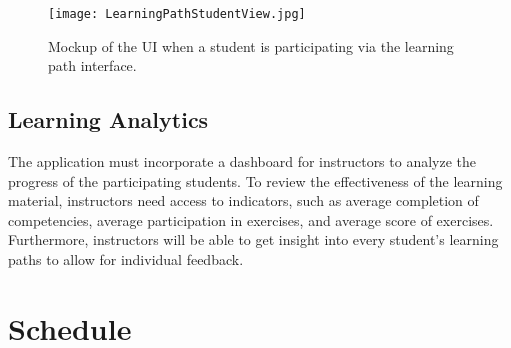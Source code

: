 \documentclass[a4paper,12pt,twoside]{article}
\begin{document}
\begin{figure}[h!]
        \centering
        \texttt{[image: LearningPathStudentView.jpg]}
        \caption{Mockup of the UI when a student is participating via the learning path interface.}
        \label{fig:LearningPathStudentViewMockup}
\end{figure}

\subsection{Learning Analytics}
The application must incorporate a dashboard for instructors to analyze the progress of the participating students. To review the effectiveness of the learning material,
instructors need access to indicators, such as average completion of competencies, average participation in exercises, and average score of exercises.
Furthermore, instructors will be able to get insight into every student's learning paths to allow for individual feedback.


\section{Schedule}
\end{document}
